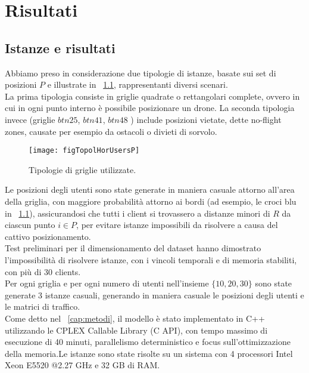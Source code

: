  \chapter{Risultati} \label{chap:risultati}

\ifpdf
    \graphicspath{{Chapter7/Figs/Raster/}{Chapter7/Figs/PDF/}{Chapter7/Figs/}}
\else
    \graphicspath{{Chapter7/Figs/Vector/}{Chapter7/Figs/}}
\fi



\section{Istanze e risultati}
Abbiamo preso in considerazione due tipologie di istanze, basate sui set di posizioni $P$ e illustrate in \figurename\ \ref{figP}, rappresentanti diversi scenari. \\
La prima tipologia consiste in griglie quadrate o rettangolari complete, ovvero in cui in ogni punto interno è possibile posizionare un drone. La seconda tipologia invece (griglie $btn25$, $btn41$, $btn48$ \cite{degioPal2013}) include posizioni vietate, dette no-flight zones, causate per esempio da ostacoli o divieti di sorvolo. \\
%
\begin{figure}
	\begin{center}
		\texttt{[image: figTopolHorUsersP]}
	\end{center}
	\caption{Tipologie di griglie utilizzate.} \label{figP}
\end{figure}
%
Le posizioni degli utenti sono state generate in maniera casuale attorno all'area della griglia, con maggiore probabilità attorno ai bordi (ad esempio, le croci blu in \figurename\ \ref{figP}), assicurandosi che tutti i client si trovassero a distanze minori di $R$ da ciascun punto $i \in P$, per evitare istanze impossibili da risolvere a causa del cattivo posizionamento. \\
Test preliminari per il dimensionamento del dataset hanno dimostrato l'impossibilità di risolvere istanze, con i vincoli temporali e di memoria stabiliti, con più di 30 clients. \\ Per ogni griglia e per ogni numero di utenti nell'insieme $\{10, 20, 30\}$ sono state generate 3 istanze casuali, generando in maniera casuale le posizioni degli utenti e le matrici di traffico. \\ 
Come detto nel \chaptername\ \ref{cap:metodi}, il modello è stato implementato in C++ utilizzando le CPLEX Callable Library (C API), con tempo massimo di esecuzione di 40 minuti, parallelismo deterministico e focus sull'ottimizzazione della memoria.Le istanze sono state risolte su un sistema con 4 processori Intel Xeon E5520 @2.27 GHz e 32 GB di RAM. \\
